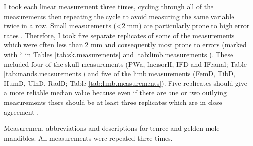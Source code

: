 	I took each linear measurement three times, cycling through all of the measurements then repeating the cycle to avoid measuring the same variable twice in a row. Small measurements (<2 mm) are particularly prone to high error rates \citep{Cardini2008}. Therefore, I took five separate replicates of some of the measurements which were often less than 2 mm and consequently most prone to errors (marked with * in Tables \ref{tab:sk.measurements} and \ref{tab:limb.measurements}). These included four of the skull measurements (PWa, IncisorH, IFD and IFcanal; Table \ref{tab:mands.measurements}) and five of the limb measurements (FemD, TibD, HumD, UlnD, RadD; Table \ref{tab:limb.measurements}). 
	Five replicates should give a more reliable median value because even if there are one or two outlying measurements there should be at least three replicates which are in close agreement \citep{Cooper2009}.

\begin{center}
\begin{table}[!htbp]
	\caption[Mandible measurements]
			{Measurement abbreviations and descriptions for tenrec and golden mole mandibles. All measurements were repeated three times.}
	
	\label{tab:mands.measurements}
\end{table}
\end{center}
\newpage

